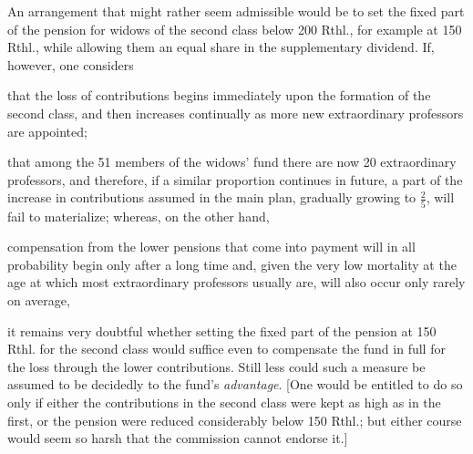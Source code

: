 An arrangement that might rather seem admissible would be to set the fixed part of the pension for widows of the second class below 200 Rthl., for example at 150 Rthl., while allowing them an equal share in the supplementary dividend. If, however, one considers

that the loss of contributions begins immediately upon the formation of the second class, and then increases continually as more new extraordinary professors are appointed;

that among the 51 members of the widows' fund there are now 20 extraordinary professors, and therefore, if a similar proportion continues in future, a part of the increase in contributions assumed in the main plan, gradually growing to \(\tfrac{2}{5}\), will fail to materialize; whereas, on the other hand,

compensation from the lower pensions that come into payment will in all probability begin only after a long time and, given the very low mortality at the age at which most extraordinary professors usually are, will also occur only rarely on average,

it remains very doubtful whether setting the fixed part of the pension at 150 Rthl. for the second class would suffice even to compensate the fund in full for the loss through the lower contributions. Still less could such a measure be assumed to be decidedly to the fund's \textit{advantage}. [One would be entitled to do so only if either the contributions in the second class were kept as high as in the first, or the pension were reduced considerably below 150 Rthl.; but either course would seem so harsh that the commission cannot endorse it.]

